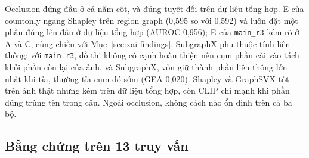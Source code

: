 Occlusion đứng đầu ở cả năm cột, và đúng tuyệt đối trên dữ liệu tổng hợp.
E của countonly ngang Shapley trên region graph (0,595 so với 0,592) và luôn đặt một phần đúng lên đầu ở dữ liệu tổng hợp (AUROC 0,956); E của \texttt{main\_r3} kém rõ ở A và C, cùng chiều với Mục~\ref{sec:xai-findings}.
SubgraphX phụ thuộc tính liên thông: với \texttt{main\_r3}, đồ thị không có cạnh hoàn thiện nên cụm phần cài vào tách khỏi phần còn lại của ảnh, và SubgraphX, vốn giữ thành phần liên thông lớn nhất khi tỉa, thường tỉa cụm đó sớm (GEA 0,020).
Shapley và GraphSVX tốt trên ảnh thật nhưng kém trên dữ liệu tổng hợp, còn CLIP chỉ mạnh khi phần đúng trùng tên trong câu.
Ngoài occlusion, không cách nào ổn định trên cả ba bộ.

\subsection{Bằng chứng trên 13 truy vấn}\label{sec:xai-cases}

